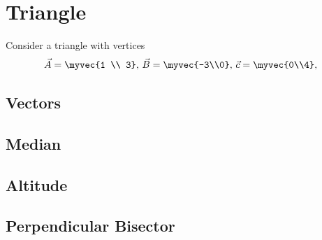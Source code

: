 \documentclass[11pt]{book}
\begin{document}
\frontmatter
\tableofcontents
\setcounter{page}{1}
\mainmatter
\chapter{Triangle}
Consider a triangle with vertices
\begin{align}
\label{eq:tri-pts}
\vec{A}=\myvec{1 \\ 3},\,
\vec{B}=\myvec{-3\\0},\,
	\vec{c}=\myvec{0\\4},\,
\end{align}

\section{Vectors}
\section{Median}
\section{Altitude}
\section{Perpendicular Bisector}
\end{document}
